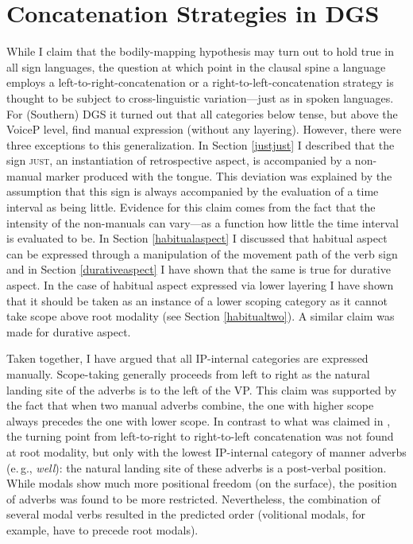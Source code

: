 

\section{Concatenation Strategies in DGS}\label{concatenatiostrategies}
While I claim that the bodily-mapping hypothesis may turn out to hold true in all sign languages, the question at which point in the clausal spine a language employs a left-to-right-concatenation or a right-to-left-concatenation strategy is thought to be subject to cross-linguistic variation---just as in spoken languages. For (Southern) DGS it turned out that all categories below tense, but above the VoiceP level, find manual expression (without any layering). However, there were three exceptions to this generalization. In Section \ref{justjust} I described that the sign \textsc{just}, an instantiation of retrospective aspect, is accompanied by a non-manual marker produced with the tongue. This deviation was explained by the assumption that this sign is always accompanied by the evaluation of a time interval as being little. Evidence for this claim comes from the fact that the intensity of the non-manuals can vary---as a function how little the time interval is evaluated to be. In Section \ref{habitualaspect} I discussed that habitual aspect can be expressed through a manipulation of the movement path of the verb sign and in Section \ref{durativeaspect} I have shown that the same is true for durative aspect. In the case of habitual aspect expressed via lower layering I have shown that it should be taken as an instance of a lower scoping category as it cannot take scope above root modality (see Section \ref{habitualtwo}). A similar claim was made for durative aspect.

Taken together, I have argued that all IP-internal categories are expressed manually. Scope-taking generally proceeds from left to right as the natural landing site of the adverbs is to the left of the VP. This claim was supported by the fact that when two manual adverbs combine, the one with higher scope always precedes the one with lower scope. In contrast to what was claimed in \citet{bross2017scope}, the turning point from left-to-right to right-to-left concatenation was not found at root modality, but only with the lowest IP-internal category of manner adverbs (e.\,g., \textit{well}): the natural landing site of these adverbs is a post-verbal position. While modals show much more positional freedom (on the surface), the position of adverbs was found to be more restricted. Nevertheless, the combination of several modal verbs resulted in the predicted order (volitional modals, for example, have to precede root modals). 

